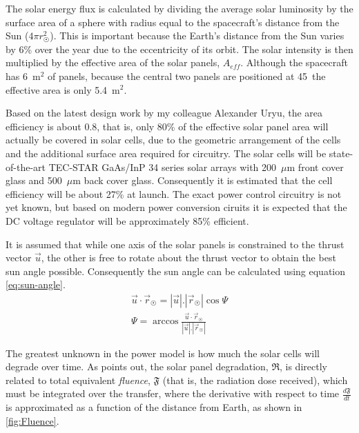 The solar energy flux is calculated by dividing the average solar luminosity \parencite[$3.846\times10^{26}$ W,][]{Montenbruck2000} by the surface area of a sphere with radius equal to the spacecraft's distance from the Sun ($4\pi r_\Sun^2$). This is important because the Earth's distance from the Sun varies by 6\% over the year \parencite{Montenbruck2000} due to the eccentricity of its orbit. The solar intensity is then multiplied by the effective area of the solar panels, $A_{eff}$. Although the spacecraft has 6~m$^2$ of panels, because the central two panels are positioned at 45\degrees\ the effective area is only 5.4~m$^2$.

Based on the latest design work by my colleague Alexander Uryu, the area efficiency is about 0.8, that is, only 80\% of the effective solar panel area will actually be covered in solar cells, due to the geometric arrangement of the cells and the additional surface area required for circuitry. The solar cells will be state-of-the-art TEC-STAR GaAs/InP 34 series solar arrays with 200~$\mu$m front cover glass and 500~$\mu$m back cover glass. Consequently it is estimated that the cell efficiency will be about 27\% at launch. The exact power control circuitry is not yet known, but based on modern power conversion ciruits it is expected that the DC voltage regulator will be approximately 85\% efficient. 

It is assumed that while one axis of the solar panels is constrained to the thrust vector $\vec{u}$, the other is free to rotate about the thrust vector to obtain the best sun angle possible. Consequently the sun angle can be calculated using equation \eqref{eq:sun-angle}.
\begin{subequations}
\begin{gather} \label{eq:sun-angle}
\vec{u}\cdot\vec{r}_\Sun = |\vec{u}|.|\vec{r}_\Sun|\cos\Psi \\
\Psi = \arccos\frac{\vec{u}\cdot\vec{r}_\Sun}{|\vec{u}|.|\vec{r}_\Sun|}
\end{gather}
\end{subequations}

The greatest unknown in the power model is how much the solar cells will degrade over time. As \textcite{Erb_thesis} points out, the solar panel degradation, $\mathfrak{R}$, is directly related to total equivalent \emph{fluence}, $\mathfrak{F}$ (that is, the radiation dose received), which must be integrated over the transfer, where the derivative with respect to time $\frac{d\mathfrak{F}}{dt}$ is approximated as a function of the distance from Earth, as shown in \autoref{fig:Fluence}. 


